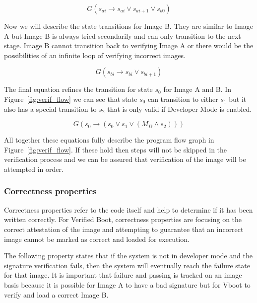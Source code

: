 \documentclass[../report.tex]{subfiles}
\begin{document}
\begin{equation}
    G(s_{ai} \to s_{ai} \lor s_{ai+1} \lor s_{b0})
\end{equation}

Now we will describe the state transitions for Image B. 
They are similar to Image A but Image B is always tried secondarily and can only transition to the next stage. 
Image B cannot transition back to verifying Image A or there would be the possibilities of an infinite loop of verifying incorrect images.

\begin{equation}
    G(s_{bi} \to s_{bi} \lor s_{bi+1})
\end{equation}

The final equation refines the transition for state $s_0$ for Image A and B.
In Figure~\ref{fig:verif_flow} we can see that state $s_0$ can transition to either $s_1$ but it also has a special transition to $s_2$ that is only valid if Developer Mode is enabled.

\begin{equation}
    G(s_0 \to (s_0 \lor s_{1} \lor (M_D \land s_{2})))
\end{equation}

All together these equations fully describe the program flow graph in Figure~\ref{fig:verif_flow}. 
If these hold then steps will not be skipped in the verification process and we can be assured that verification of the image will be attempted in order.

\subsubsection{Correctness properties}

Correctness properties refer to the code itself and help to determine if it has been written correctly.
For Verified Boot, correctness properties are focusing on the correct attestation of the image and attempting to guarantee that an incorrect image cannot be marked as correct and loaded for execution.

The following property states that if the system is not in developer mode and the signature verification fails, then the system will eventually reach the failure state for that image.
It is important that failure and passing is tracked on an image basis because it is possible for Image A to have a bad signature but for Vboot to verify and load a correct Image B.
\end{document}
